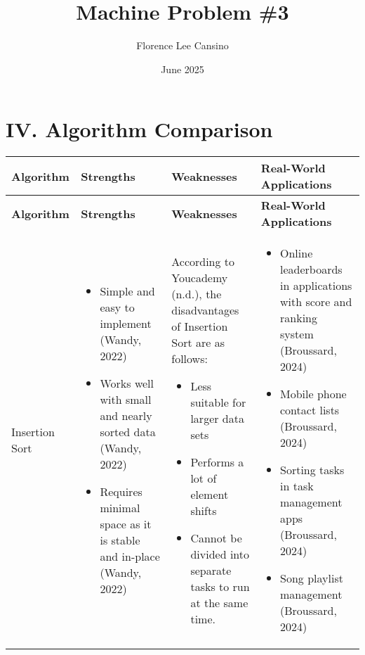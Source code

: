 \documentclass{article}
\title{Machine Problem \#3}
\author{Florence Lee Cansino}
\date{June 2025}
\begin{document}
\maketitle

\section{IV. Algorithm Comparison}

\begin{longtable}{|p{2.5cm}|p{4.3cm}|p{4.3cm}|p{}|}
\hline
\textbf{Algorithm} & \textbf{Strengths} & \textbf{Weaknesses} & \textbf{Real-World \newline Applications} \\
\hline
\endfirsthead
\hline
\textbf{Algorithm} & \textbf{Strengths} & \textbf{Weaknesses} & \textbf{Real-World Applications} \\
\hline
\endhead

Insertion Sort &
\begin{itemize}
\itemindent=-13pt
\item Simple and easy to implement (Wandy, 2022)
\item Works well with small and nearly sorted data (Wandy, 2022)
\item Requires minimal space as it is stable and in-place (Wandy, 2022)
\end{itemize}
&
According to Youcademy (n.d.), the disadvantages of Insertion Sort are as follows:
\begin{itemize}
\itemindent=-13pt
\item Less suitable for larger data sets
\item Performs a lot of element shifts
\item Cannot be divided into separate tasks to run at the same time.
\end{itemize}
&
\begin{itemize}
\itemindent=-13pt
\item Online leaderboards in applications with score and ranking system (Broussard, 2024)
\item Mobile phone contact lists (Broussard, 2024)
\item Sorting tasks in task management apps (Broussard, 2024)
\item Song playlist management (Broussard, 2024)
\end{itemize}
\\
\hline


\end{longtable}
\end{document}
